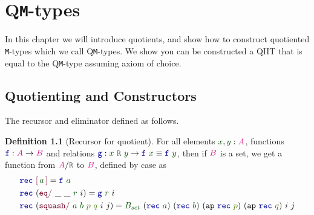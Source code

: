 \documentclass[twoside,11pt,openright]{report}
\theoremstyle{plain} %
\theoremstyle{definition}
\newtheorem{defn}[thm]{Definition}%
\theoremstyle{remark}
\newcommand*{\term}[1]{\textcolor{green!30!black}{#1}} %
\newcommand*{\pathterm}[1]{\textcolor{green!65!red!75!black}{#1}}
\newcommand*{\type}[1]{\textcolor{magenta!90!black}{#1}}
\newcommand*{\relation}[1]{\textcolor{gray!75!black}{\ensuremath{\mathtt{#1}}}}
\newcommand*{\function}[1]{\textcolor{blue!60!black}{\ensuremath{\mathtt{#1}}}}
\newcommand*{\constructor}[1]{\textcolor{purple!60!black}{\ensuremath{\mathtt{#1}}}}
\newcommand*{\quotientconstructor}[1]{\constructor{[}\,#1\,\constructor{]}}
\begin{document}

\chapter{Q\texttt{M}-types}
\label{ch:QM-types}
In this chapter we will introduce quotients, and show how to construct quotiented \texttt{M}-types which we call Q\texttt{M}-types. We show you can be constructed a QIIT that is equal to the Q\texttt{M}-type assuming axiom of choice. 

\section{Quotienting and Constructors}
The recursor and eliminator defined as follows.
\begin{defn}[Recursor for quotient]
  \label{defn:quotient-recursor}
  For all elements \(\term{x}, \term{y} : \type{A}\), functions \(\function{f} : \type{A} \rightarrow \type{B}\) and relations \(\function{g} : \term{x}~\relation{R}~\term{y} \rightarrow \function{f}~\term{x} \equiv \function{f}~\term{y}\), then if \(\type{B}\) is a set, we get a function from \(\type{A} / \relation{R}\) to \(\type{B}\), defined by case as
  \begin{equation}
    \label{eq:quotient-recursor}
    \begin{aligned}
      &\function{rec}~\quotientconstructor{\term{a}} = \function{f}~\term{a} \\
      &\function{rec}~(\constructor{eq/}~\_~\_~\term{r}~i) = \function{g}~\term{r}~i \\
      &\function{rec}~(\constructor{squash/}~\term{a}~\term{b}~\pathterm{p}~\pathterm{q}~i~j) = \term{B_{set}}~(\function{rec}~\term{a})~(\function{rec}~\term{b})~(\mathtt{ap}~\function{rec}~\pathterm{p})~(\mathtt{ap}~\function{rec}~\pathterm{q})~i~j
    \end{aligned}
  \end{equation}
\end{defn}
\end{document}
